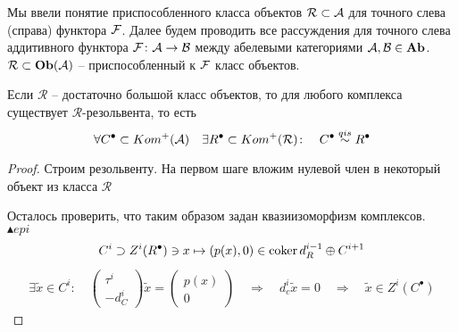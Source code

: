 \documentclass[../main.tex]{subfiles}
\begin{document}
Мы ввели понятие приспособленного класса объектов $\mathcal{R}\subset \mathcal{A}$ для точного слева (справа) функтора $\mathcal{F}$. Далее будем проводить все рассуждения для точного слева аддитивного функтора $\mathcal{F}\colon \mathcal{A} \to \mathcal{B}$ между абелевыми категориями $\mathcal{A}, \mathcal{B} \in \mathbf{Ab}$. $\mathcal{R}\subset \mathbf{Ob}(\mathcal{A})$ -- приспособленный к $\mathcal{F}$ класс объектов.
\begin{to_claim}
 Если $\mathcal{R}$ -- достаточно большой класс объектов, то для любого комплекса существует $\mathcal{R}$-резольвента, то есть
 \[
 \forall C^\bullet \subset Kom^{+}(\mathcal{A}) \quad \exists R^\bullet \subset Kom^+(\mathcal{R}) \colon \quad C^\bullet \overset{qis}{\sim} R^\bullet
 \]
\end{to_claim}
\begin{proof}
Строим резольвенту. На первом шаге вложим нулевой член в некоторый объект из класса $\mathcal{R}$
\bee
{}
\eee
\bee
{}
\eee
\bee
{}
\eee
Осталось проверить, что таким образом задан квазиизоморфизм комплексов.\\ 
$\blacktriangle epi$
\begin{align*}
    C^i \supset Z^i(R^\bullet) \ni x \mapsto (p(x), 0) \in \operatorname{coker} d^{i-1}_R\oplus C^{i+1}
\end{align*}
\begin{align*}
    \exists \widetilde{x}  \in C^i \colon \quad
                          \begin{pmatrix} \tau^i \\ -d^{i}_C \end{pmatrix} \widetilde{x} = \begin{pmatrix} p(x) \\ 0 \end{pmatrix} \quad \Rightarrow \quad d_c^i\widetilde{x} = 0 \quad \Rightarrow \quad \widetilde{x} \in Z^i(C^\bullet)

\end{align*}
\end{proof}
\end{document}
